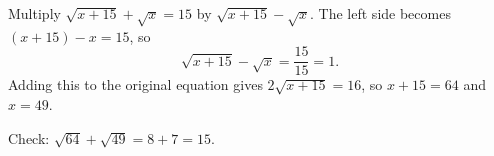 Multiply $\sqrt{x+15}+\sqrt x=15$ by $\sqrt{x+15}-\sqrt x$. The left side becomes $(x+15)-x=15$, so
\[\sqrt{x+15}-\sqrt x=\dfrac{15}{15}=1 .\]
Adding this to the original equation gives $2\sqrt{x+15}=16$, so $x+15=64$ and $x=\boxed{49}$.

Check: $\sqrt{64}+\sqrt{49}=8+7=15$.
